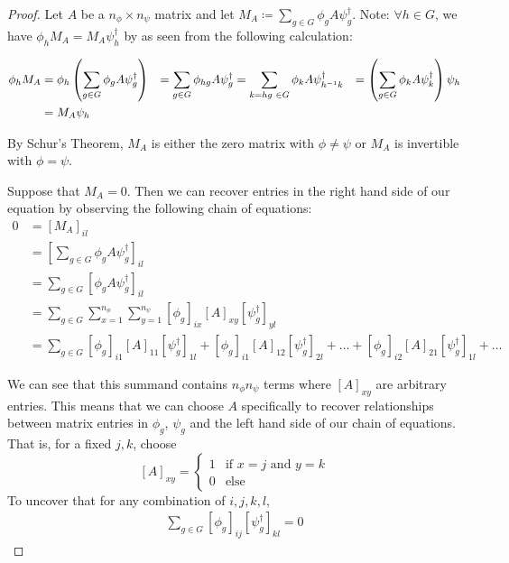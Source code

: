 \documentclass[10pt]{ucthesis}
\begin{document}
\begin{proof} Let $A$ be a $n_\phi \times n_\psi$ matrix and let $M_A \coloneq \sum_{g\in G} \phi_{g} A \psi_g^{\dag}$. Note: $\forall h \in G$, we have $\phi_h M_A  = M_A \psi_h^\dag$ by as seen from the following calculation:

\begin{equation}
	\begin{aligned}
		\phi_h M_A &=  \phi_h \left(\sum_{g\in G} \phi_{g} A \psi_g^{\dag}\right) &= \sum_{g\in G} \phi_{hg} A \psi_g^{\dag} &= \sum_{k = hg \hspace{1mm} \in G} \phi_k A \psi_{h^{-1}k}^{\dag} &= \left(\sum_{g\in G} \phi_{k} A \psi_k^{\dag} \right)\psi_h \\ &= M_A\psi_h 
	\end{aligned}
\end{equation}

By Schur's Theorem, $M_A$ is either the zero matrix with $\phi \neq \psi$ or $M_A$ is invertible with $\phi=\psi$. 

Suppose that $M_A = 0$. Then we can recover entries in the right hand side of our equation by observing the following chain of equations:
\begin{equation}
	\begin{aligned}
		    0 &= \left[M_A\right]_{il} \\ 
			&= \left[\sum_{g\in G} \phi_{g} A \psi_g^{\dag}\right]_{il} \\
			&= \sum_{g\in G} \left[\phi_{g} A \psi_g^{\dag}\right]_{il} \\
			&= \sum_{g\in G} \sum_{x=1}^{n_\phi} \sum_{y=1}^{n_\psi}\left[\phi_{g}\right]_{ix} \left[A\right]_{xy} \left[\psi_g^{\dag}\right]_{yl} \\
			&= \sum_{g\in G} \left[\phi_{g}\right]_{i1} \left[A\right]_{11} \left[\psi_g^{\dag}\right]_{1l} + \left[\phi_{g}\right]_{i1} \left[A\right]_{12} \left[\psi_g^{\dag}\right]_{2l} + \hdots + \left[\phi_{g}\right]_{i2} \left[A\right]_{21} \left[\psi_g^{\dag}\right]_{1l} + \hdots
	\end{aligned}
\end{equation}

We can see that this summand contains $n_\phi n_\psi$ terms where $[A]_{xy}$ are arbitrary entries. This means that we can choose $A$ specifically to recover relationships between matrix entries in $\phi_g$, $\psi_g$ and the left hand side of our chain of equations. That is, for a fixed $j,k$, choose $$[A]_{xy} = \begin{cases}
												1 & \text{if }x=j\text{ and } y=k \\
												0 & \text{else}
\end{cases}$$
To uncover that for any combination of $i,j,k,l,$
\begin{equation}
	\begin{aligned}
		\sum_{g\in G} \left[\phi_g\right]_{ij}\left[\psi^\dag_g\right]_{kl} = 0
	\end{aligned}
\end{equation}


\end{proof}
\end{document}
